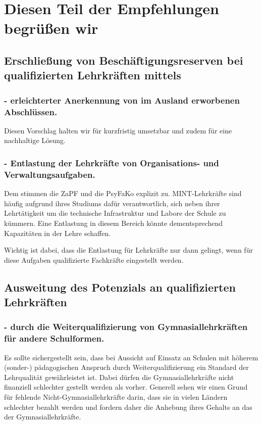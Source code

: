 \documentclass[DIV=calc]{scrartcl}
\begin{document}
\section*{Diesen Teil der Empfehlungen begrüßen wir}
\subsection*{Erschließung von Beschäftigungsreserven bei qualifizierten Lehrkräften mittels}
\subsubsection*{- erleichterter Anerkennung von im Ausland erworbenen Abschlüssen.}
Diesen Vorschlag halten wir für kurzfristig umsetzbar und zudem für eine nachhaltige Lösung.

\subsubsection*{- Entlastung der Lehrkräfte von Organisations- und Verwaltungsaufgaben.}
Dem stimmen die ZaPF und die PsyFaKo explizit zu. MINT-Lehrkräfte sind häufig aufgrund %
ihres Studiums dafür verantwortlich, sich neben ihrer Lehrtätigkeit um die technische Infrastruktur und Labore der Schule zu kümmern. 
Eine Entlastung in diesem Bereich könnte dementsprechend Kapazitäten in der Lehre schaffen.

Wichtig ist dabei, dass die Entlastung für Lehrkräfte nur dann gelingt, wenn für diese Aufgaben qualifizierte Fachkräfte eingestellt werden.

\subsection*{Ausweitung des Potenzials an qualifizierten Lehrkräften}
\subsubsection*{- durch die Weiterqualifizierung von Gymnasiallehrkräften für andere Schulformen.}
Es sollte sichergestellt sein, dass bei Aussicht auf Einsatz an Schulen mit höherem (sonder-) pädagogischen Anspruch durch Weiterqualifizierung ein Standard der Lehrqualität gewährleistet ist.
Dabei dürfen die Gymnasiallehrkräfte nicht finanziell schlechter gestellt werden als vorher. Generell sehen wir einen Grund für fehlende Nicht-Gymnasiallehrkräfte darin, dass sie in vielen Ländern schlechter bezahlt werden und fordern daher die Anhebung ihres Gehalts an das der Gymnasiallehrkräfte.
\end{document}
